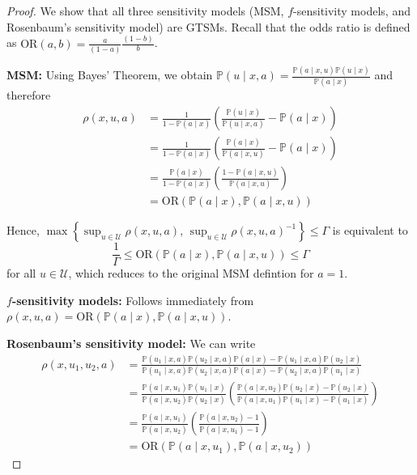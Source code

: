 \documentclass{article} %
\theoremstyle{definition}
\theoremstyle{plain}
\begin{document}
\begin{proof}
We show that all three sensitivity models (MSM, $f$-sensitivity models, and Rosenbaum's sensitivity model) are GTSMs. Recall that the odds ratio is defined as $\mathrm{OR}(a, b) =  \frac{a}{(1 - a)} \frac{(1 - b)}{b}$.

\textbf{MSM:} Using Bayes' Theorem, we obtain $\mathbb{P}(u \mid x, a) = \frac{\mathbb{P}(a \mid x, u) \mathbb{P}(u \mid x)}{\mathbb{P}(a \mid x)}$ and therefore
\begin{align}
\rho(x, u, a) &=  \frac{1}{1 - \mathbb{P}(a \mid x)} \left(\frac{\mathbb{P}(u \mid x)}{\mathbb{P}(u \mid x, a)} - \mathbb{P}(a \mid x) \right) \\
&= \frac{1}{1 - \mathbb{P}(a \mid x)} \left(\frac{\mathbb{P}(a \mid x)}{\mathbb{P}(a \mid x, u)} - \mathbb{P}(a \mid x) \right)\\
&= \frac{\mathbb{P}(a \mid x)}{1 - \mathbb{P}(a \mid x)} \left(\frac{1 - \mathbb{P}(a \mid x, u)}{\mathbb{P}(a \mid x, u)}  \right) \\
&= \mathrm{OR}\left(\mathbb{P}(a \mid x), \mathbb{P}(a \mid x, u)\right)
\end{align}

Hence, $\max\left\{\sup_{u \in \mathcal{U}} \rho(x, u, a), \, \sup_{u \in \mathcal{U}} \rho(x, u, a)^{-1} \right\} \leq \Gamma$ is equivalent to 
\begin{equation}
    \frac{1}{\Gamma} \leq \mathrm{OR}\left(\mathbb{P}(a \mid x), \mathbb{P}(a \mid x, u)\right) \leq \Gamma
\end{equation}
for all $u \in \mathcal{U}$, which reduces to the original MSM defintion for $a=1$.

\textbf{$f$-sensitivity models:} Follows immediately from $\rho(x, u, a) = \mathrm{OR}\left(\mathbb{P}(a \mid x), \mathbb{P}(a \mid x, u)\right)$.

\textbf{Rosenbaum's sensitivity model:} 
We can write 
\begin{align}
\rho(x, u_1, u_2, a) &= \frac{\mathbb{P}(u_1 \mid x, a) \mathbb{P}(u_2 \mid x, a) \mathbb{P}(a \mid x) - \mathbb{P}(u_1 \mid x, a) \mathbb{P}(u_2 \mid x)}{\mathbb{P}(u_1 \mid x, a) \mathbb{P}(u_2 \mid x, a) \mathbb{P}(a \mid x) - \mathbb{P}(u_2 \mid x, a) \mathbb{P}(u_1 \mid x)}\\
&= \frac{\mathbb{P}(a \mid x, u_1) \mathbb{P}(u_1 \mid x)}{\mathbb{P}(a \mid x, u_2) \mathbb{P}(u_2 \mid x)} \left(\frac{\mathbb{P}(a \mid x, u_2) \mathbb{P}(u_2 \mid x) - \mathbb{P}(u_2 \mid x)}{\mathbb{P}(a \mid x, u_1) \mathbb{P}(u_1 \mid x) - \mathbb{P}(u_1 \mid x)} \right) \\
&= \frac{\mathbb{P}(a \mid x, u_1)}{\mathbb{P}(a \mid x, u_2)} \left(\frac{\mathbb{P}(a \mid x, u_2)  - 1}{\mathbb{P}(a \mid x, u_1) - 1} \right) \\
&= \mathrm{OR}\left(\mathbb{P}(a \mid x, u_1), \mathbb{P}(a \mid x, u_2)\right)
\end{align}


\end{proof}
\end{document}
